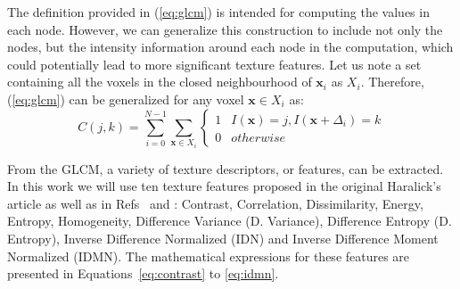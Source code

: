 The definition provided in (\ref{eq:glcm}) is intended for computing the values in each node. However, we can generalize this construction to include not only the nodes, but the intensity information around each node in the computation, which could potentially lead to more significant texture features. Let us note a set containing all the voxels in the closed neighbourhood of $\mathbf{x}_i$ as $X_i$. Therefore, (\ref{eq:glcm}) can be generalized for any voxel $\mathbf{x} \in X_i$ as:
\begin{equation}\label{eq:glcmGen}
C(j,k) = \sum_{i=0}^{N-1} \sum_{\mathbf{x} \in X_i}
\begin{cases}
1 & I(\mathbf{x}) = j, I(\mathbf{x}+\Delta_i)=k\\
0 & otherwise
\end{cases}
\end{equation}

From the GLCM, a variety of texture descriptors, or features, can be extracted. In this work we will use ten texture features proposed in the original Haralick's article\cite{Haralick73} as well as in Refs~\cite{soh1999texture} and \cite{clausi2002analysis}: Contrast\cite{Haralick73}, Correlation\cite{Haralick73}, Dissimilarity\cite{soh1999texture}, Energy\cite{Haralick73}, Entropy\cite{soh1999texture}, Homogeneity\cite{Haralick73}, Difference Variance\cite{Haralick73} (D. Variance), Difference Entropy\cite{Haralick73} (D. Entropy), Inverse Difference Normalized\cite{clausi2002analysis} (IDN) and Inverse Difference Moment Normalized\cite{clausi2002analysis} (IDMN). The mathematical expressions for these features are presented in Equations~\ref{eq:contrast} to \ref{eq:idmn}.

